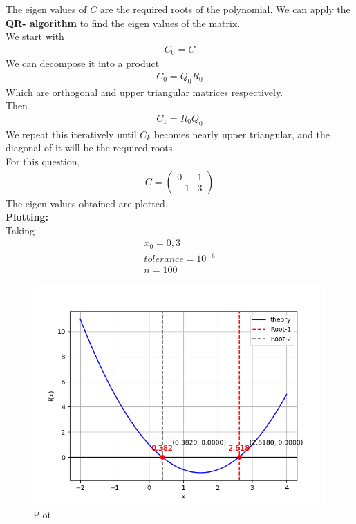 \documentclass[journal]{IEEEtran}
\begin{document}
The eigen values of $C$ are the required roots of the polynomial.
We can apply the \textbf{QR- algorithm} to find the eigen values of the matrix.\\
We start with 
\begin{align}
    C_0=C
\end{align}
We can decompose it into a product 
\begin{align}
    C_0=Q_0R_0
\end{align}
Which are orthogonal and upper triangular matrices respectively.\\
Then 
\begin{align}
    C_1=R_0Q_0
\end{align}
We repeat this iteratively until $C_k$ becomes nearly upper triangular, and the diagonal of it will be the required roots.\\
For this question, 
\begin{align}
    C=\begin{pmatrix}
        0 & 1\\
        -1 & 3
    \end{pmatrix}
\end{align}
The eigen values obtained are plotted.
\\
\textbf{Plotting:}\\
Taking 
\begin{align}
x_0=0, 3\\
tolerance=10^{-6}\\
n=100
\end{align}
\begin{figure}[h!]
   \centering
   \includegraphics[width=1\columnwidth]{Figs/Figure_1.png}
   \caption{Plot}
\end{figure}
\end{document}

